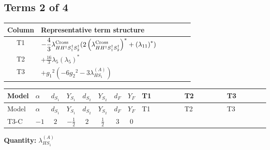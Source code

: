 \documentclass[8pt]{article}
\begin{document}
\begin{landscape}
\subsection*{Terms 2 of 4}
\begin{center}
\begin{tabular}{@{}c >{\raggedright\arraybackslash}p{0.82\linewidth}@{}}
\toprule
Column & Representative term structure \\
\midrule
T1 & \(\displaystyle -\frac{4}{3} {\lambda_{H H^\dagger S_1^\dagger S_2^\dagger}^{\rm Cross}} (2 \left({\lambda_{H H^\dagger S_1^\dagger S_2^\dagger}^{\rm Cross}}\right)^{*}+\left({\lambda_{11}}\right)^{*})\) \\
\midrule
T2 & \(\displaystyle +\frac{16}{3} {\lambda_5} \left({\lambda_5}\right)^{*}\) \\
\midrule
T3 & \(\displaystyle +{g_1}^2 \left(-6 {g_2}^2-3 {\lambda_{HS_1}^{(A)}}\right)\) \\
\midrule
\bottomrule
\end{tabular}
\end{center}
\smallskip
\tiny
\begin{longtable}{@{}llcccccc >{\raggedright\arraybackslash}p{0.21\linewidth} >{\raggedright\arraybackslash}p{0.21\linewidth} >{\raggedright\arraybackslash}p{0.21\linewidth}@{}}
\toprule
Model & $\alpha$ & $d_{S_1}$ & $Y_{S_1}$ & $d_{S_2}$ & $Y_{S_2}$ & $d_F$ & $Y_F$ & T1 & T2 & T3 \\
\midrule
\endfirsthead
\toprule
Model & $\alpha$ & $d_{S_1}$ & $Y_{S_1}$ & $d_{S_2}$ & $Y_{S_2}$ & $d_F$ & $Y_F$ & T1 & T2 & T3 \\
\midrule
\endhead
T3-C & $-1$ & $2$ & $-\frac{1}{2}$ & $2$ & $\frac{1}{2}$ & $3$ & $0$ & \scriptsize\adjustbox{max width=\linewidth}{$\begin{gathered} -\frac{4}{3} {\lambda_{H H^\dagger S_1^\dagger S_2^\dagger}^{\rm Cross}} (2 \left({\lambda_{H H^\dagger S_1^\dagger S_2^\dagger}^{\rm Cross}}\right)^{*}+\left({\lambda_{11}}\right)^{*})\end{gathered}$} & \scriptsize\adjustbox{max width=\linewidth}{$\begin{gathered} +\frac{16}{3} {\lambda_5} \left({\lambda_5}\right)^{*}\end{gathered}$} & \scriptsize\adjustbox{max width=\linewidth}{$\begin{gathered} +{g_1}^2 \left(-6 {g_2}^2-3 {\lambda_{HS_1}^{(A)}}\right)\end{gathered}$} \\
\midrule
\bottomrule
\end{longtable}
\clearpage
\noindent\textbf{Quantity: }$\lambda_{HS_1}^{(A)}$\par\smallskip

\end{landscape}
\end{document}
